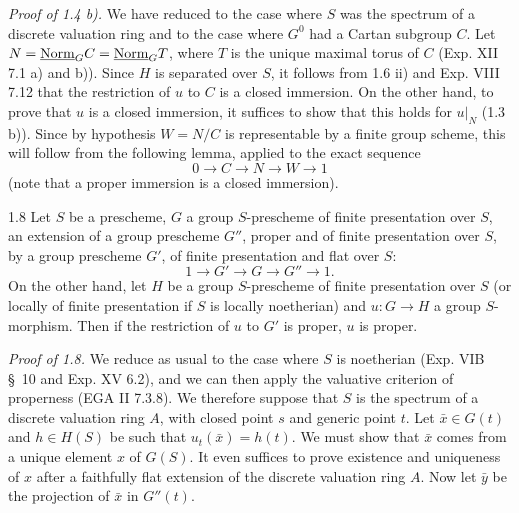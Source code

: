 \par\noindent\emph{Proof of 1.4 b).}
We have reduced to the case where $S$ was the spectrum of a discrete valuation ring and to the case where $G^0$ had a Cartan subgroup $C$. Let $N=\underline{\mathrm{Norm}}_G C=\underline{\mathrm{Norm}}_G T$, where $T$ is the unique maximal torus of $C$ (Exp. XII 7.1 a) and b)). Since $H$ is separated over $S$, it follows from 1.6 ii) and Exp. VIII 7.12 that the restriction of $u$ to $C$ is a closed immersion. On the other hand, to prove that $u$ is a closed immersion, it suffices to show that this holds for $u|_N$ (1.3 b)). Since by hypothesis $W=N/C$ is representable by a finite group scheme, this will follow from the following lemma, applied to the exact sequence
\[
0\longrightarrow C\longrightarrow N\longrightarrow W\longrightarrow1
\]
(note that a proper immersion is a closed immersion).
\begin{lemma}{1.8}\label{XVI.1.8}
Let $S$ be a prescheme, $G$ a group $S$-prescheme of finite presentation over $S$, an extension of a group prescheme $G''$, proper and of finite presentation over $S$, by a group prescheme $G'$, of finite presentation and flat over $S$:
\[
1\longrightarrow G'\longrightarrow G\longrightarrow G''\longrightarrow1.
\]
On the other hand, let $H$ be a group $S$-prescheme of finite presentation over $S$ (or locally of finite presentation if $S$ is locally noetherian) and $u:G\to H$ a group $S$-morphism. Then if the restriction of $u$ to $G'$ is proper, $u$ is proper.
\end{lemma}
\par\noindent\emph{Proof of 1.8.}
We reduce as usual to the case where $S$ is noetherian (Exp. VIB \S\ 10 and Exp. XV 6.2), and we can then apply the valuative criterion of properness (EGA II 7.3.8). We therefore suppose that $S$ is the spectrum of a discrete valuation ring $A$, with closed point $s$ and generic point $t$. Let $\bar x\in G(t)$ and $h\in H(S)$ be such that $u_t(\bar x)=h(t)$. We must show that $\bar x$ comes from a unique element $x$ of $G(S)$. It even suffices to prove existence and uniqueness of $x$ after a faithfully flat extension of the discrete valuation ring $A$. Now let $\bar y$ be the projection of $\bar x$ in $G''(t)$.
